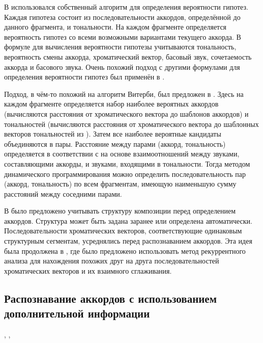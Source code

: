 В \cite{Yoshioka2004} использовался собственный алгоритм для определения
вероятности гипотез. Каждая гипотеза состоит из последовательности аккордов,
определённой до данного фрагмента, и тональности. На каждом фрагменте
определяется вероятность гипотез со всеми возможными вариантами текущего
аккорда. В формуле для вычисления вероятности гипотезы учитываются тональность,
вероятность смены аккорда, хроматический вектор, басовый звук, сочетаемость
аккорда и басового звука. Очень похожий подход с другими формулами для
определения вероятности гипотез был применён в \cite{Sumi2008}.

Подход, в чём-то похожий на алгоритм Витерби, был предложен в \cite{Rocher2010}.
Здесь на каждом фрагменте определяется набор наиболее вероятных аккордов
(вычисляются расстояния от хроматического вектора до шаблонов аккордов) и
тональностей (вычисляются расстояния от хроматического вектора до шаблонных
векторов тональностей из \cite{Temperley2001}). Затем все наиболее вероятные
кандидаты объединяются в пары. Расстояние между парами (аккорд, тональность)
определяется в соответствии с \cite{Lerdahl2001} на основе взаимоотношений
между звуками, составляющими аккорды, и звуками, входящими в тональности. Тогда
методом динамического программирования можно определить последовательность пар
(аккорд, тональность) по всем фрагментам, имеющую наименьшую сумму расстояний
между соседними парами.

В \cite{Mauch2009} было предложено учитывать структуру композиции перед
определением аккордов. Структура может быть задана заранее или определена
автоматически. Последовательности хроматических векторов, соответствующие
одинаковым структурным сегментам, усреднялись перед распознаванием аккордов. Эта
идея была продолжена в \cite{Cho2011}, где было предложено использовать метод
рекуррентного анализа для нахождения похожих друг на друга последовательностей
хроматических векторов и их взаимного сглаживания.


\subsection{Распознавание аккордов с использованием дополнительной информации}
\label{ssectT_recconstr}

\cite{Zhang2008}, \cite{Mcvicar2011}, \cite{Hrybyk2010}

\clearpage